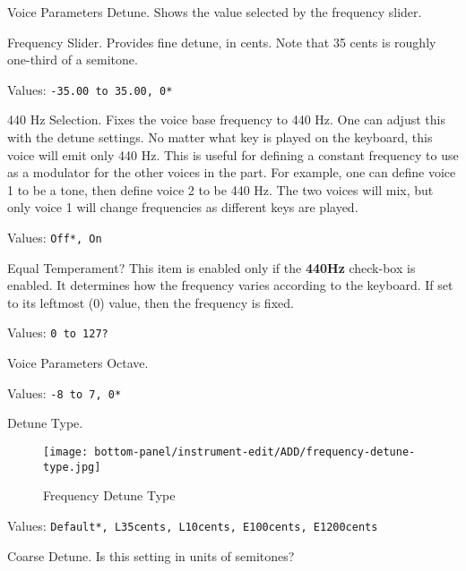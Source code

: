    \setcounter{ItemCounter}{0}      %

   Voice Parameters Detune.
   Shows the value selected by the frequency slider.

   Frequency Slider.
   Provides fine detune, in cents.
   Note that 35 cents is roughly one-third of a semitone.

   Values: \texttt{-35.00 to 35.00, 0*}

   440 Hz Selection.
   Fixes the voice base frequency to 440 Hz.
   One can adjust this with the detune settings.
   No matter what key is played on the keyboard, this voice will emit only
   440 Hz.  This is useful for defining a constant frequency to use as a
   modulator for the other voices in the part.
   For example, one can define voice 1 to be a tone, then
   define voice 2 to be 440 Hz.  The two voices will mix, but only voice 1
   will change frequencies as different keys are played.

   Values: \texttt{Off*, On}

   Equal Temperament?
   This item is enabled only if the \textbf{440Hz} check-box is enabled.
   It determines how the frequency varies according to the 
   keyboard.  If set to its leftmost (0) value, then the frequency is fixed.

   Values: \texttt{0 to 127?}

   Voice Parameters Octave.

   Values: \texttt{-8 to 7, 0*}

%

   Detune Type.

\begin{figure}[H]
   \centering 
   \texttt{[image: bottom-panel/instrument-edit/ADD/frequency-detune-type.jpg]}
   \caption{Frequency Detune Type}
   \label{fig:frequency_detune_tYpe}
\end{figure}

   Values: \texttt{Default*, L35cents, L10cents, E100cents, E1200cents}

   Coarse Detune.
   Is this setting in units of semitones?

